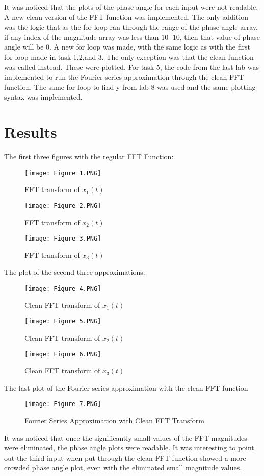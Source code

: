 \documentclass[12pt]{article}
\begin{document}
\newline
It was noticed that the plots of the phase angle for each input were not readable. A new clean version of the FFT function was implemented. The only addition was the logic that as the for loop ran through the range of the phase angle array, if any index of the magnitude array was less than $10^-10$, then that value of phase angle will be 0.\newline
A new for loop was made, with the same logic as with the first for loop made in task 1,2,and 3. The only exception was that the clean function was called instead. These were plotted.
\newline
For task 5, the code from the last lab was implemented to run the Fourier series approximation through the clean FFT function. The same for loop to find y from lab 8 was used and the same plotting syntax was implemented.
\clearpage
\section{Results}
The first three figures with the regular FFT Function:
\begin{figure}[H]
\texttt{[image: Figure 1.PNG]}
  \caption{FFT transform of $x_1(t)$}
  \end{figure}
\begin{figure}[H]
\texttt{[image: Figure 2.PNG]}
  \caption{FFT transform of $x_2(t)$}
  \end{figure}
\begin{figure}[H]
\texttt{[image: Figure 3.PNG]}
  \caption{FFT transform of $x_3(t)$}
  \end{figure}  
The plot of the second three approximations:
\begin{figure}[H]
\texttt{[image: Figure 4.PNG]} 
  \caption{Clean FFT transform of $x_1(t)$}
  \end{figure}
\begin{figure}[H]
\texttt{[image: Figure 5.PNG]} 
  \caption{Clean FFT transform of $x_2(t)$}
  \end{figure}
\begin{figure}[H]
\texttt{[image: Figure 6.PNG]} 
  \caption{Clean FFT transform of $x_3(t)$}
  \end{figure}
The last plot of the Fourier series approximation with the clean FFT function  
 \begin{figure}[H]
\texttt{[image: Figure 7.PNG]} 
  \caption{Fourier Series Approximation with Clean FFT Transform}
  \end{figure} 
It was noticed that once the significantly small values of the FFT magnitudes were eliminated, the phase angle plots were readable. It was interesting to point out the third input when put through the clean FFT function showed a more crowded phase angle plot, even with the eliminated small magnitude values.
\newline
\end{document}
